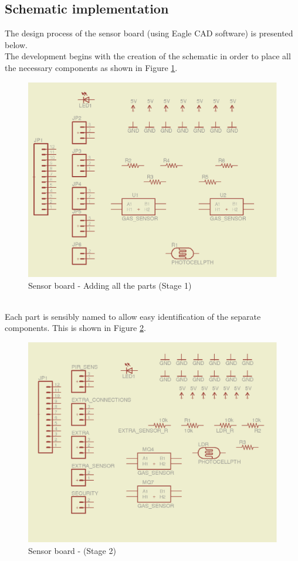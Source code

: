 \documentclass[12pt,a4paper,draft]{report}
\begin{document}
\subsection{Schematic implementation}
The design process of the sensor board (using Eagle CAD software) is presented below.
\ \\
The development begins with the creation of the schematic in order to place all the necessary components as shown in Figure \ref{Sensor-brd-s1}.
\ \\
\begin{figure}[H]
\centering
\includegraphics*[scale=0.25]{sens_brd_s1}
\caption{Sensor board - Adding all the parts (Stage 1)}
\label{Sensor-brd-s1}
\end{figure}
\ \\
Each part is sensibly named to allow easy identification of the separate components.
This is shown in Figure \ref{Sensor-brd-s2}.
\begin{figure}[H]
\centering
\includegraphics*[scale=0.25]{sens_brd_s2}
\caption{Sensor board -  (Stage 2)}
\label{Sensor-brd-s2}
\end{figure}
\end{document}
